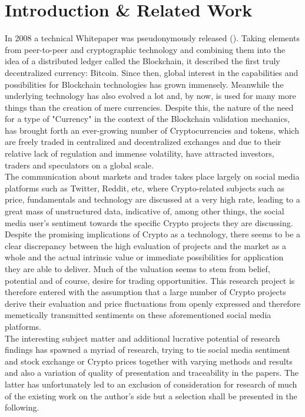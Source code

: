 \documentclass[11pt]{article}
\begin{document}
\section{Introduction \& Related Work}
In 2008 a technical Whitepaper was pseudonymously released (\citet{bitcoin}). Taking elements from peer-to-peer and cryptographic technology and combining them into the idea of a distributed ledger called the Blockchain, it described the first truly decentralized currency: Bitcoin. Since then, global interest in the capabilities and possibilities for Blockchain technologies has grown immensely. Meanwhile the underlying technology has also evolved a lot and, by now, is used for many more things than the creation of mere currencies. Despite this, the nature of the need for a type of "Currency" in the context of the Blockchain validation mechanics, has brought forth an ever-growing number of Cryptocurrencies and tokens, which are freely traded in centralized and decentralized exchanges and due to their relative lack of regulation and immense volatility, have attracted investors, traders and speculators on a global scale. \\
The communication about markets and trades takes place largely on social media platforms such as Twitter, Reddit, etc, where Crypto-related subjects such as price, fundamentals and technology are discussed at a very high rate, leading to a great mass of unstructured data, indicative of, among other things, the social media user's sentiment towards the specific Crypto projects they are discussing. \\
Despite the promising implications of Crypto as a technology, there seems to be a clear discrepancy between the high evaluation of projects and the market as a whole and the actual intrinsic value or immediate possibilities for application they are able to deliver. Much of the valuation seems to stem from belief, potential and of course, desire for trading opportunities. This research project is therefore entered with the assumption that a large number of Crypto projects derive their evaluation and price fluctuations from openly expressed and therefore memetically transmitted sentiments on these aforementioned social media platforms. \\
The interesting subject matter and additional lucrative potential of research findings has spawned a myriad of research, trying to tie social media sentiment and stock exchange or Crypto prices together with varying methods and results and also a variation of quality of presentation and traceability in the papers. The latter has unfortunately led to an exclusion of consideration for research of much of the existing work on the author's side but a selection shall be presented in the following. \\
\end{document}
